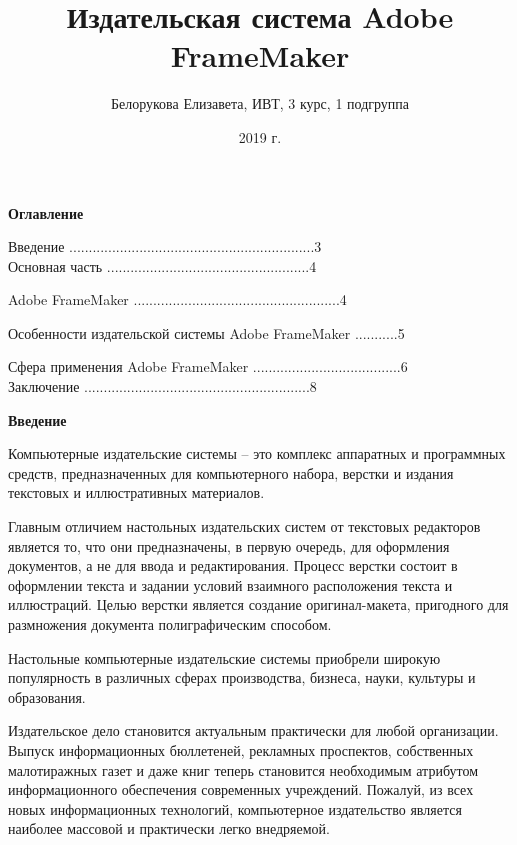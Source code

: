 \documentclass[a4paper,12pt]{article} %
\author{Белорукова Елизавета, ИВТ, 3 курс, 1 подгруппа}
\title{\textbf{Издательская система Adobe FrameMaker}}
\date{2019 г.}
\begin{document}

\maketitle
\newpage

\begin{center}
\huge \textbf{Оглавление}
\end{center}
\Large
Введение ...............................................................\Large3\\
Основная часть ....................................................\Large4

\large
Adobe FrameMaker .....................................................\Large4

\large 
Особенности издательской системы Adobe FrameMaker ...........\Large5

\large 
Сфера применения Adobe FrameMaker ......................................\Large6\\
\Large Заключение ..........................................................\Large8\
\newpage

\begin{center}
\huge \textbf{Введение}
\end{center}

\normalsize

Компьютерные издательские системы -- это комплекс аппаратных и программных средств, предназначенных для компьютерного набора, верстки и издания текстовых и иллюстративных материалов. 

Главным отличием настольных издательских систем от текстовых редакторов является то, что они предназначены, в первую очередь, для оформления документов, а не для ввода и редактирования. Процесс верстки состоит в оформлении текста и задании условий взаимного расположения текста и иллюстраций. Целью верстки является создание оригинал-макета, пригодного для размножения документа полиграфическим способом.

Настольные компьютерные издательские системы приобрели широкую популярность в различных сферах производства, бизнеса, науки, культуры и образования.

Издательское дело становится актуальным практически для любой организации. Выпуск информационных бюллетеней, рекламных проспектов, собственных малотиражных газет и даже книг теперь становится необходимым атрибутом информационного обеспечения современных учреждений. Пожалуй, из всех новых информационных технологий, компьютерное издательство является наиболее массовой и практически легко внедряемой.
\end{document}
